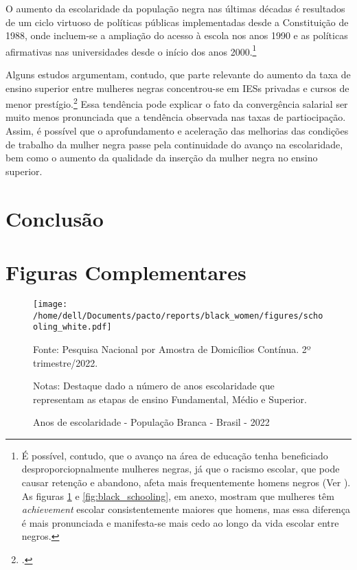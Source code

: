 \documentclass[12pt]{article}
\begin{document}
\par O aumento da escolaridade da população negra nas últimas décadas é resultados de um ciclo virtuoso de políticas públicas implementadas desde a Constituição de 1988, onde incluem-se a ampliação do acesso à escola nos anos 1990 e as políticas afirmativas nas universidades desde o início dos anos 2000.\footnote{É possível, contudo, que o avanço na área de educação tenha beneficiado desproporciopnalmente mulheres negras, já que o racismo escolar, que pode causar retenção e abandono, afeta mais frequentemente homens negros (Ver \autocite{carvalho2004fracasso}). As figuras \ref{fig:white_schooling} e \ref{fig:black_schooling}, em anexo, mostram que mulheres têm \textit{achievement} escolar consistentemente maiores que homens, mas essa diferença é mais pronunciada e manifesta-se mais cedo ao longo da vida escolar entre negros.}

\par Alguns estudos argumentam, contudo, que parte relevante do aumento da taxa de ensino superior entre mulheres negras concentrou-se em IESs privadas e cursos de menor prestígio.\footcite[Cap. 1]{marcondes2013dossie} Essa tendência pode explicar o fato da convergência salarial ser muito menos pronunciada que a tendência observada nas taxas de partiocipação. Assim, é possível que o aprofundamento e aceleração das melhorias das condições de trabalho da mulher negra passe pela continuidade do avanço na escolaridade, bem como o aumento da qualidade da inserção da mulher negra no ensino superior.

\section{Conclusão}

\clearpage

\appendix

\section*{Figuras Complementares} \label{fig_comp}

\begin{figure}[H]
    \centering
    \caption{Anos de escolaridade - População Branca - Brasil - 2022}
        \texttt{[image: /home/dell/Documents/pacto/reports/black\_women/figures/schooling\_white.pdf]}
    \label{fig:white_schooling}
    \begin{floatnotes}
        \item[Fonte:] Pesquisa Nacional por Amostra de Domicílios Contínua. 2º trimestre/2022.
        \item[Notas:] Destaque dado a número de anos escolaridade que representam as etapas de ensino Fundamental, Médio e Superior.
    \end{floatnotes}
\end{figure}
\end{document}
